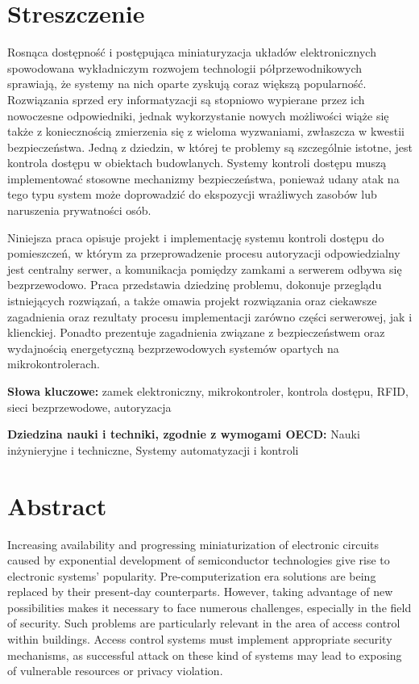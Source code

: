 \section*{Streszczenie}

	Rosnąca dostępność i postępująca miniaturyzacja układów elektronicznych spowodowana wykładniczym rozwojem technologii półprzewodnikowych sprawiają, że systemy na nich oparte zyskują coraz większą popularność. Rozwiązania sprzed ery informatyzacji są stopniowo wypierane przez ich nowoczesne odpowiedniki, jednak wykorzystanie nowych możliwości wiąże się także z koniecznością zmierzenia się z wieloma wyzwaniami, zwłaszcza w kwestii bezpieczeństwa. Jedną z dziedzin, w której te problemy są szczególnie istotne, jest kontrola dostępu w obiektach budowlanych. Systemy kontroli dostępu muszą implementować stosowne mechanizmy bezpieczeństwa, ponieważ udany atak na tego typu system może doprowadzić do ekspozycji wrażliwych zasobów lub naruszenia prywatności osób.

	Niniejsza praca opisuje projekt i implementację systemu kontroli dostępu do pomieszczeń, w którym za przeprowadzenie procesu autoryzacji odpowiedzialny jest centralny serwer, a komunikacja pomiędzy zamkami a serwerem odbywa się bezprzewodowo. Praca przedstawia dziedzinę problemu, dokonuje przeglądu istniejących rozwiązań, a także omawia projekt rozwiązania oraz ciekawsze zagadnienia oraz rezultaty procesu implementacji zarówno części serwerowej, jak i klienckiej. Ponadto prezentuje zagadnienia związane z bezpieczeństwem oraz wydajnością energetyczną bezprzewodowych systemów opartych na mikrokontrolerach.

	\textbf{Słowa kluczowe:} zamek elektroniczny, mikrokontroler, kontrola dostępu, RFID, sieci bezprzewodowe, autoryzacja

	\textbf{Dziedzina nauki i techniki, zgodnie z wymogami OECD:} Nauki inżynieryjne i techniczne, Systemy automatyzacji i kontroli

\newpage

\section*{Abstract}

	Increasing availability and progressing miniaturization of electronic circuits caused by exponential development of semiconductor technologies give rise to electronic systems' popularity. Pre-computerization era solutions are being replaced by their present-day counterparts. However, taking advantage of new possibilities makes it necessary to face numerous challenges, especially in the field of security. Such problems are particularly relevant in the area of access control within buildings. Access control systems must implement appropriate security mechanisms, as successful attack on these kind of systems may lead to exposing of vulnerable resources or privacy violation.

